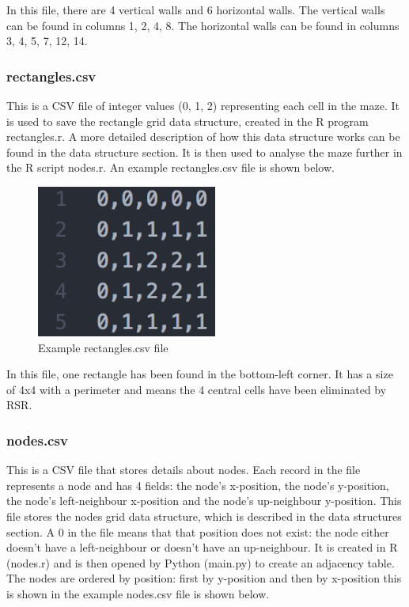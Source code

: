 \documentclass[titlepage]{article}
\begin{document}
In this file, there are 4 vertical walls and 6 horizontal walls. The vertical walls can be found in columns 1, 2, 4, 8. The horizontal walls can be found in columns 3, 4, 5, 7, 12, 14. 

\subsubsection{rectangles.csv}
This is a CSV file of integer values (0, 1, 2) representing each cell in the maze. It is used to save the rectangle grid data structure, created in the R program rectangles.r. A more detailed description of how this data structure works can be found in the data structure section. It is then used to analyse the maze further in the R script nodes.r. An example rectangles.csv file is shown below.

\begin{figure}[H]
  \centering
  \includegraphics[height=5cm]{recyy.png}
  \caption{Example rectangles.csv file}
  \label{fig:dijk}
\end{figure}

In this file, one rectangle has been found in the bottom-left corner. It has a size of 4x4 with a perimeter and means the 4 central cells have been eliminated by RSR.

\subsubsection{nodes.csv}
This is a CSV file that stores details about nodes. Each record in the file represents a node and has 4 fields: the node's x-position, the node's y-position, the node's left-neighbour x-position and the node's up-neighbour y-position. This file stores the nodes grid data structure, which is described in the data structures section. A 0 in the file means that that position does not exist: the node either doesn't have a left-neighbour or doesn't have an up-neighbour. It is created in R (nodes.r) and is then opened by Python (main.py) to create an adjacency table. The nodes are ordered by position: first by y-position and then by x-position this is shown in the example nodes.csv file is shown below. 
\end{document}
